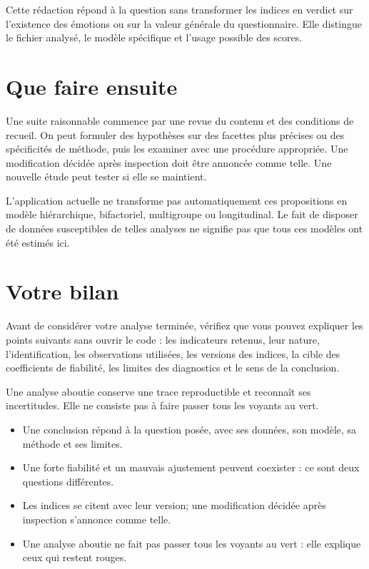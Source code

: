 \documentclass[
  french,
  11pt,
  a4paper,
  DIV=11,
  numbers=noendperiod]{scrreprt}
\providecommand{\tightlist}{%
  \setlength{\itemsep}{0pt}\setlength{\parskip}{0pt}}
\begin{document}
Cette rédaction répond à la question sans transformer les indices en
verdict sur l'existence des émotions ou sur la valeur générale du
questionnaire. Elle distingue le fichier analysé, le modèle spécifique
et l'usage possible des scores.

\section{Que faire ensuite}\label{que-faire-ensuite}

Une suite raisonnable commence par une revue du contenu et des
conditions de recueil. On peut formuler des hypothèses sur des facettes
plus précises ou des spécificités de méthode, puis les examiner avec une
procédure appropriée. Une modification décidée après inspection doit
être annoncée comme telle. Une nouvelle étude peut tester si elle se
maintient.

L'application actuelle ne transforme pas automatiquement ces
propositions en modèle hiérarchique, bifactoriel, multigroupe ou
longitudinal. Le fait de disposer de données susceptibles de telles
analyses ne signifie pas que tous ces modèles ont été estimés ici.

\section{Votre bilan}\label{votre-bilan}

Avant de considérer votre analyse terminée, vérifiez que vous pouvez
expliquer les points suivants sans ouvrir le code : les indicateurs
retenus, leur nature, l'identification, les observations utilisées, les
versions des indices, la cible des coefficients de fiabilité, les
limites des diagnostics et le sens de la conclusion.

Une analyse aboutie conserve une trace reproductible et reconnaît ses
incertitudes. Elle ne consiste pas à faire passer tous les voyants au
vert.

\begin{tcolorbox}[enhanced jigsaw, arc=.35mm, bottomrule=.15mm, bottomtitle=1mm, breakable, colback=white, colbacktitle=quarto-callout-important-color!10!white, colframe=quarto-callout-important-color-frame, coltitle=black, left=2mm, leftrule=.75mm, opacityback=0, opacitybacktitle=0.6, rightrule=.15mm, title={À retenir}, titlerule=0mm, toprule=.15mm, toptitle=1mm]

\begin{itemize}
\tightlist
\item
  Une conclusion répond à la question posée, avec ses données, son
  modèle, sa méthode et ses limites.
\item
  Une forte fiabilité et un mauvais ajustement peuvent coexister : ce
  sont deux questions différentes.
\item
  Les indices se citent avec leur version; une modification décidée
  après inspection s'annonce comme telle.
\item
  Une analyse aboutie ne fait pas passer tous les voyants au vert : elle
  explique ceux qui restent rouges.
\end{itemize}

\end{tcolorbox}
\end{document}

